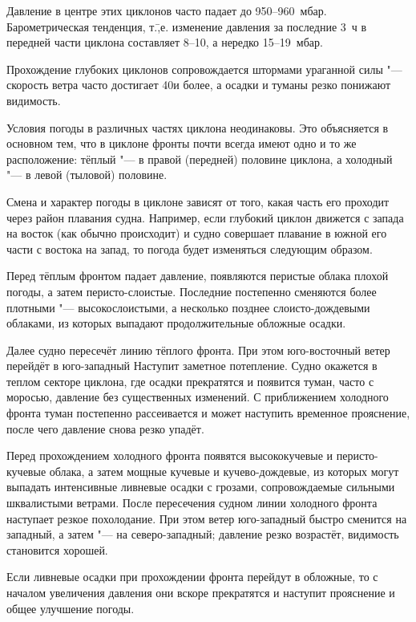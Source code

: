 Давление в центре этих циклонов часто падает до 950--960~мбар.
Барометрическая тенденция, т.\=,е. изменение давления за
последние 3~ч в передней части циклона составляет 8--10, а нередко
15--19~мбар.

Прохождение глубоких циклонов сопровождается штормами ураганной силы "---
скорость ветра часто достигает 40\speedms и более, а осадки и туманы
резко понижают видимость.

Условия погоды в различных частях циклона неодинаковы. Это объясняется
в основном тем, что в циклоне фронты почти всегда имеют одно и то же
расположение: тёплый "--- в правой (передней) половине циклона, а
холодный "--- в левой (тыловой) половине.

Смена и характер погоды в циклоне зависят от того, какая часть его
проходит через район плавания судна. Например, если глубокий циклон
движется с запада на восток (как обычно происходит) и судно совершает
плавание в южной его части с востока на запад, то погода будет
изменяться следующим образом.

Перед тёплым фронтом падает давление, появляются перистые облака
плохой погоды, а затем перисто-слоистые. Последние постепенно
сменяются более плотными "--- высокослоистыми, а несколько позднее
слоисто-дождевыми облаками, из которых выпадают продолжительные
обложные осадки.

Далее судно пересечёт линию тёплого фронта. При этом юго-восточный
ветер перейдёт в юго-западный Наступит заметное потепление. Судно
окажется в теплом секторе циклона, где осадки прекратятся и появится
туман, часто с моросью, давление без существенных изменений. С
приближением холодного фронта туман постепенно рассеивается и может
наступить временное прояснение, после чего давление снова резко
упадёт.

Перед прохождением холодного фронта появятся высококучевые и
перисто-кучевые облака, а затем мощные кучевые и кучево-дождевые, из
которых могут выпадать интенсивные ливневые осадки с грозами,
сопровождаемые сильными шквалистыми ветрами. После пересечения судном
линии холодного фронта наступает резкое похолодание. При этом ветер
юго-западный быстро сменится на западный, а затем "--- на
северо-западный; давление резко возрастёт, видимость становится
хорошей.

Если ливневые осадки при прохождении фронта перейдут в обложные, то с
началом увеличения давления они вскоре прекратятся и наступит
прояснение и общее улучшение погоды.


